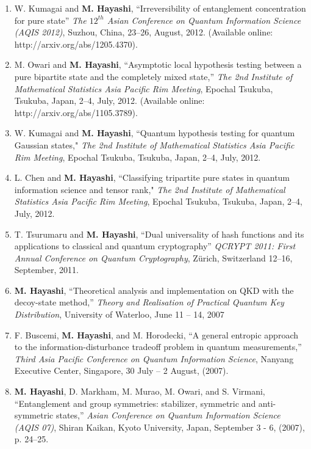 \documentclass[a4paper,12pt,oneside]{article}
\begin{document}
\begin{enumerate}
\item 
W. Kumagai and \textbf{M. Hayashi}, ``Irreversibility of entanglement concentration for pure state''
{\em The $12^{th}$ Asian Conference on Quantum Information Science (AQIS 2012)},
Suzhou, China, 23--26, August, 2012.
(Available online: http://arxiv.org/abs/1205.4370).

\item 
M. Owari and \textbf{M. Hayashi}, 
``Asymptotic local hypothesis testing between a pure bipartite state and the completely mixed state,''
{\em The 2nd Institute of Mathematical Statistics Asia Pacific Rim Meeting}, 
Epochal Tsukuba, Tsukuba, Japan, 2--4, July, 2012.
(Available online: http://arxiv.org/abs/1105.3789).

\item 
W. Kumagai and \textbf{M. Hayashi}, 
``Quantum hypothesis testing for quantum Gaussian states," 
{\em The 2nd Institute of Mathematical Statistics Asia Pacific Rim Meeting}, 
Epochal Tsukuba, Tsukuba, Japan, 2--4, July, 2012.

\item 
L. Chen and \textbf{M. Hayashi}, 
``Classifying tripartite pure states in quantum information science and tensor rank," 
{\em The 2nd Institute of Mathematical Statistics Asia Pacific Rim Meeting}, 
Epochal Tsukuba, Tsukuba, Japan, 2--4, July, 2012.

\item 
T. Tsurumaru and \textbf{M. Hayashi}, ``Dual universality of hash functions and its applications to classical and quantum cryptography'' 
{\em QCRYPT 2011: First Annual Conference on Quantum Cryptography}, 
Z\"{u}rich, Switzerland 12--16, September, 2011.

\item
\textbf{M. Hayashi}, ``Theoretical analysis and implementation on QKD with the decoy-state method,'' 
{\em Theory and Realisation of Practical Quantum Key Distribution}, 
University of Waterloo, June 11 -- 14, 2007

\item
F. Buscemi, \textbf{M. Hayashi}, and M. Horodecki, ``A general entropic approach to the information-disturbance tradeoff problem in quantum measurements,'' 
{\em Third Asia Pacific Conference on Quantum Information Science}, 
Nanyang Executive Center, Singapore, 
30 July -- 2 August, (2007).

\item
\textbf{M. Hayashi}, D. Markham, M. Murao, M. Owari, and S. Virmani, ``Entanglement and group symmetries: stabilizer, symmetric and anti-symmetric states,'' 
{\em Asian Conference on Quantum Information Science (AQIS 07)}, 
Shiran Kaikan, Kyoto University, Japan, September 3 - 6, (2007), p. 24--25.


\end{enumerate}
\end{document}
